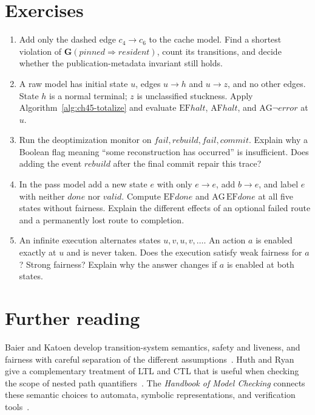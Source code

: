 \section{Exercises}
\label{sec:ch45-exercises}

\begin{enumerate}
\item\label{ex:ch45-cache-witness}
Add only the dashed edge $c_4\to c_6$ to the cache model.
Find a shortest violation of $\mathbf{G}(\mathit{pinned}\Rightarrow\mathit{resident})$, count its transitions, and decide whether the publication-metadata invariant still holds.

\item\label{ex:ch45-terminal-policy}
A raw model has initial state $u$, edges $u\to h$ and $u\to z$, and no other edges.
State $h$ is a normal terminal; $z$ is unclassified stuckness.
Apply Algorithm~\ref{alg:ch45-totalize} and evaluate $\mathrm{EF}\mathit{halt}$, $\mathrm{AF}\mathit{halt}$, and $\mathrm{AG}\neg\mathit{error}$ at $u$.

\item\label{ex:ch45-monitor-history}
Run the deoptimization monitor on $\mathit{fail},\mathit{rebuild},\mathit{fail},\mathit{commit}$.
Explain why a Boolean flag meaning \enquote{some reconstruction has occurred} is insufficient.
Does adding the event $\mathit{rebuild}$ after the final commit repair this trace?

\item\label{ex:ch45-branching}
In the pass model add a new state $e$ with only $e\to e$, add $b\to e$, and label $e$ with neither $\mathit{done}$ nor $\mathit{valid}$.
Compute $\mathrm{EF}\mathit{done}$ and $\mathrm{AG}\,\mathrm{EF}\mathit{done}$ at all five states without fairness.
Explain the different effects of an optional failed route and a permanently lost route to completion.

\item\label{ex:ch45-fairness-gap}
An infinite execution alternates states $u,v,u,v,\ldots$.
An action $a$ is enabled exactly at $u$ and is never taken.
Does the execution satisfy weak fairness for $a$? Strong fairness?
Explain why the answer changes if $a$ is enabled at both states.
\end{enumerate}

\section{Further reading}
\label{sec:ch45-reading}

Baier and Katoen develop transition-system semantics, safety and liveness, and fairness with careful separation of the different assumptions~\cite{baier-2008-model-checking}.
Huth and Ryan give a complementary treatment of LTL and CTL that is useful when checking the scope of nested path quantifiers~\cite{huth-2004-logic}.
The \emph{Handbook of Model Checking} connects these semantic choices to automata, symbolic representations, and verification tools~\cite{clarke-2018-handbook}.
